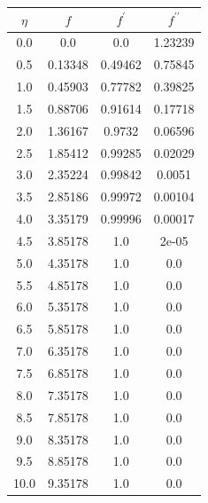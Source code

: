 \begin{table}
{\begin{tabular}{|c|c|c|c|}
            $\eta$ & $f$ & $f^\prime$ & $f^{\prime\prime}$ \\ \hline
            0.0 & 0.0 & 0.0 & 1.23239 \\ \hline
            0.5 & 0.13348 & 0.49462 & 0.75845 \\ \hline
            1.0 & 0.45903 & 0.77782 & 0.39825 \\ \hline
            1.5 & 0.88706 & 0.91614 & 0.17718 \\ \hline
            2.0 & 1.36167 & 0.9732 & 0.06596 \\ \hline
            2.5 & 1.85412 & 0.99285 & 0.02029 \\ \hline
            3.0 & 2.35224 & 0.99842 & 0.0051 \\ \hline
            3.5 & 2.85186 & 0.99972 & 0.00104 \\ \hline
            4.0 & 3.35179 & 0.99996 & 0.00017 \\ \hline
            4.5 & 3.85178 & 1.0 & 2e-05 \\ \hline
            5.0 & 4.35178 & 1.0 & 0.0 \\ \hline
            5.5 & 4.85178 & 1.0 & 0.0 \\ \hline
            6.0 & 5.35178 & 1.0 & 0.0 \\ \hline
            6.5 & 5.85178 & 1.0 & 0.0 \\ \hline
            7.0 & 6.35178 & 1.0 & 0.0 \\ \hline
            7.5 & 6.85178 & 1.0 & 0.0 \\ \hline
            8.0 & 7.35178 & 1.0 & 0.0 \\ \hline
            8.5 & 7.85178 & 1.0 & 0.0 \\ \hline
            9.0 & 8.35178 & 1.0 & 0.0 \\ \hline
            9.5 & 8.85178 & 1.0 & 0.0 \\ \hline
            10.0 & 9.35178 & 1.0 & 0.0 \\ \hline
        \end{tabular}
        \label{table_m6}
    }
\end{table}

